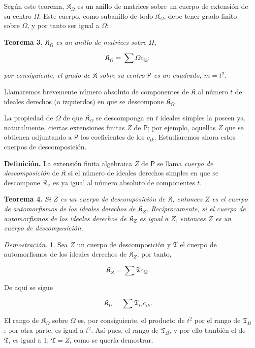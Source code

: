Según este teorema, \(\mathfrak K_\Omega\) es un anillo de matrices sobre un cuerpo de extensión de su centro \(\Omega\). Este cuerpo, como subanillo de todo \(\mathfrak K_\Omega\), debe tener grado finito sobre \(\Omega\), y por tanto ser igual a \(\Omega\):

\textbf{Teorema 3.} \emph{\(\mathfrak K_\Omega\) es un anillo de matrices sobre \(\Omega\),}

\[
\mathfrak K_\Omega=\sum\Omega c_{ik};
\]

\emph{por consiguiente, el grado de \(\mathfrak K\) sobre su centro \(\mathsf P\) es un cuadrado, \(m=t^2\).}

Llamaremos brevemente número absoluto de componentes de \(\mathfrak K\) al número \(t\) de ideales derechos (o izquierdos) en que se descompone \(\mathfrak K_\Omega\).

La propiedad de \(\Omega\) de que \(\mathfrak K_\Omega\) se descomponga en \(t\) ideales simples la poseen ya, naturalmente, ciertas extensiones finitas \(Z\) de \(\mathsf P\); por ejemplo, aquellas \(Z\) que se obtienen adjuntando a \(\mathsf P\) los coeficientes de los \(c_{ik}\). Estudiaremos ahora estos cuerpos de descomposición.

\textbf{Definición.} La extensión finita algebraica \(Z\) de \(\mathsf P\) se llama \emph{cuerpo de descomposición} de \(\mathfrak K\) si el número de ideales derechos simples en que se descompone \(\mathfrak K_Z\) es ya igual al número absoluto de componentes \(t\).

\textbf{Teorema 4.} \emph{Si \(Z\) es un cuerpo de descomposición de \(\mathfrak K\), entonces \(Z\) es el cuerpo de automorfismos de los ideales derechos de \(\mathfrak K_Z\). Recíprocamente, si el cuerpo de automorfismos de los ideales derechos de \(\mathfrak K_Z\) es igual a \(Z\), entonces \(Z\) es un cuerpo de descomposición.}

\emph{Demostración.} 1. Sea \(Z\) un cuerpo de descomposición y \(\mathfrak T\) el cuerpo de automorfismos de los ideales derechos de \(\mathfrak K_Z\); por tanto,

\[
\mathfrak K_Z=\sum\mathfrak T c_{ik}.
\]

De aquí se sigue

\[
\mathfrak K_\Omega=\sum\mathfrak T_\Omega c_{ik}.
\]

El rango de \(\mathfrak K_\Omega\) sobre \(\Omega\) es, por consiguiente, el producto de \(t^2\) por el rango de \(\mathfrak T_\Omega\); por otra parte, es igual a \(t^2\). Así pues, el rango de \(\mathfrak T_\Omega\), y por ello también el de \(\mathfrak T\), es igual a 1; \(\mathfrak T=Z\), como se quería demostrar.

